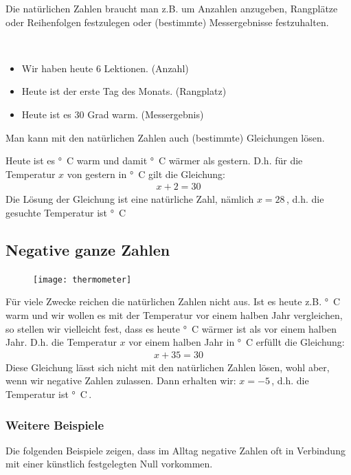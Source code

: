 \vspace{.5cm}
Die natürlichen Zahlen braucht man z.B. um Anzahlen anzugeben, Rangplätze oder Reihenfolgen festzulegen oder (bestimmte) Messergebnisse festzuhalten.

\begin{example}~
	\begin{itemize}\setlength\itemsep{0pt}
		\item Wir haben heute 6 Lektionen. (Anzahl)
		\item Heute ist der erste Tag des Monats. (Rangplatz)
		\item Heute ist es 30 Grad warm. (Messergebnis)
	\end{itemize}
\end{example}

Man kann mit den natürlichen Zahlen auch (bestimmte) Gleichungen lösen.
\begin{example}
 Heute ist es \unit[30]{°C} warm und damit \unit[2]{°C} wärmer als gestern.
 D.h. für die Temperatur $x$ von gestern in \unit{°C} gilt die Gleichung:
 \begin{align*}
   x + 2 = 30
 \end{align*}
Die Lösung der Gleichung ist eine natürliche Zahl, nämlich $x = 28$\,, d.h. die gesuchte Temperatur ist \unit[28]{°C}
\end{example}


\subsection{Negative ganze Zahlen}
\begin{figure}
 \texttt{[image: thermometer]}
\end{figure}
Für viele Zwecke reichen die natürlichen Zahlen nicht aus.
Ist es heute z.B. \unit[30]{°C} warm und wir wollen es mit der Temperatur vor einem halben Jahr vergleichen, so stellen wir vielleicht fest, dass es heute \unit[35]{°C} wärmer ist als vor einem halben Jahr.
D.h. die Temperatur $x$ vor einem halben Jahr in \unit{°C} erfüllt die Gleichung:
\begin{align*}
	x + 35 = 30
\end{align*}
Diese Gleichung lässt sich nicht mit den natürlichen Zahlen lösen, wohl aber, wenn wir negative Zahlen zulassen.
Dann erhalten wir: $x = -5$\,, d.h. die Temperatur ist \unit[--5]{°C}\,.

\subsubsection{Weitere Beispiele}
Die folgenden Beispiele zeigen, dass im Alltag negative Zahlen oft in Verbindung mit einer künstlich festgelegten Null vorkommen.

